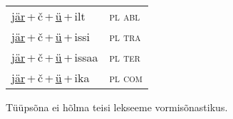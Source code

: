 \begin{minipage}{\textwidth}
\begin{sideways}
\begin{tabular}{l l}
\underline{jär}\,+\,č\,+\,\underline{ü}\,+\,ilt & \textsc{ pl abl } \\
\underline{jär}\,+\,č\,+\,\underline{ü}\,+\,issi & \textsc{ pl tra } \\
\underline{jär}\,+\,č\,+\,\underline{ü}\,+\,issaa & \textsc{ pl ter } \\
\underline{jär}\,+\,č\,+\,\underline{ü}\,+\,ika & \textsc{ pl com } \\
\end{tabular}
\end{sideways}
\label{tab:tüüpsõnamall-järčü}

\end{minipage}

 
\vspace{1em}
\noindent Tüüpsõna ei hõlma teisi lekseeme vormi\-sõnastikus.
